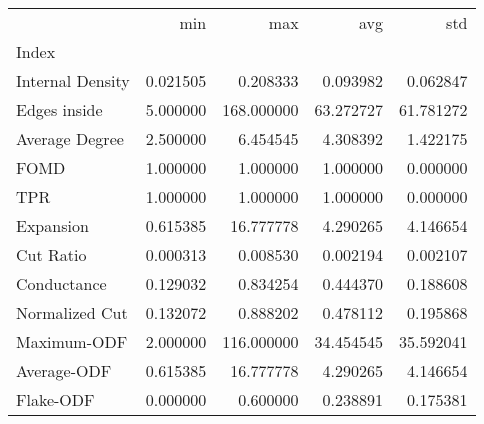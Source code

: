 \begin{tabular}{lrrrr}
\toprule
{} &       min &         max &        avg &        std \\
Index            &           &             &            &            \\
\midrule
Internal Density &  0.021505 &    0.208333 &   0.093982 &   0.062847 \\
Edges inside     &  5.000000 &  168.000000 &  63.272727 &  61.781272 \\
Average Degree   &  2.500000 &    6.454545 &   4.308392 &   1.422175 \\
FOMD             &  1.000000 &    1.000000 &   1.000000 &   0.000000 \\
TPR              &  1.000000 &    1.000000 &   1.000000 &   0.000000 \\
Expansion        &  0.615385 &   16.777778 &   4.290265 &   4.146654 \\
Cut Ratio        &  0.000313 &    0.008530 &   0.002194 &   0.002107 \\
Conductance      &  0.129032 &    0.834254 &   0.444370 &   0.188608 \\
Normalized Cut   &  0.132072 &    0.888202 &   0.478112 &   0.195868 \\
Maximum-ODF      &  2.000000 &  116.000000 &  34.454545 &  35.592041 \\
Average-ODF      &  0.615385 &   16.777778 &   4.290265 &   4.146654 \\
Flake-ODF        &  0.000000 &    0.600000 &   0.238891 &   0.175381 \\
\bottomrule
\end{tabular}
